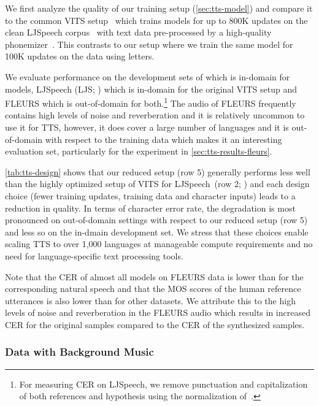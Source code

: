 We first analyze the quality of our training setup (\textsection\ref{sec:tts-model}) and compare it to the common VITS setup~\citep{kim2021conditional} which trains models for up to 800K updates on the clean LJSpeech corpus~\citep{ljspeech17} with text data pre-processed by a high-quality phonemizer~\citep{g2pE2019}. 
This contrasts to our setup where we train the same model for 100K updates on the \MMS{} data using letters.

\insertTableResultsTTSDesign
\insertTableResultsTTSDrama


We evaluate performance on the development sets of \MMS{} which is in-domain for \MMS{} models, LJSpeech (LJS; \citealt{ljspeech17}) which is in-domain for the original VITS setup and FLEURS which is out-of-domain for both.\footnote{For measuring CER on LJSpeech, we remove punctuation and capitalization of both references and hypothesis using the normalization of~\citet{radford2022whisper}.}
The audio of FLEURS frequently contains high levels of noise and reverberation and it is relatively uncommon to use it for TTS, however, it does cover a large number of languages and it is out-of-domain with respect to the \MMS{} training data which makes it an interesting evaluation set, particularly for the experiment in \textsection\ref{sec:tts-results-fleurs}.

\autoref{tab:tts-design} shows that our reduced setup (row 5) generally performs less well than the highly optimized setup of VITS for LJSpeech~(row 2; \citealt{kim2021conditional}) and each design choice (fewer training updates, \MMS{} training data and character inputs) leads to a reduction in quality.
In terms of character error rate, the degradation is most pronounced on out-of-domain settings with respect to our reduced setup (row 5) and less so on the in-dmain \MMS{} development set.
We stress that these choices enable scaling TTS to over 1,000 languages at manageable compute requirements and no need for language-specific text processing tools.



Note that the CER of almost all models on FLEURS data is lower than for the corresponding natural speech and that the MOS scores of the human reference utterances is also lower than for other datasets.
We attribute this to the high levels of noise and reverberation in the FLEURS audio which results in increased CER for the original samples compared to the CER of the synthesized samples.

\subsubsection{Data with Background Music}

